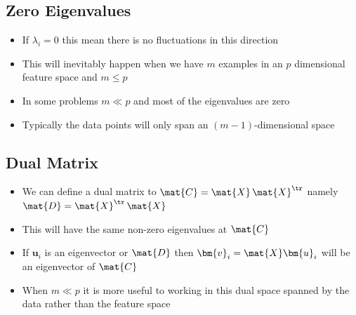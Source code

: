 
\begin{slide}
\section{Zero Eigenvalues}

\begin{PauseHighLight}
  \begin{itemize}
  \item If $\lambda_i=0$ this mean there is no fluctuations in this
    direction\pause
  \item This will inevitably happen when we have $m$ examples in an $p$
    dimensional feature space and $m\leq p$\pause
  \item In some problems $m\ll p$ and most of the eigenvalues are
    zero\pause
  \item Typically the data points will only span an $(m-1)$-dimensional
    space\pause
  \end{itemize}
\end{PauseHighLight}

\end{slide}


\begin{slide}
\section{Dual Matrix}

\begin{PauseHighLight}
  \begin{itemize}
  \item We can define a dual matrix to $\mat{C} = \mat{X}\,\mat{X}^\tr$
    namely $\mat{D} = \mat{X}^\tr\,\mat{X}$\pause
  \item This will have the same non-zero eigenvalues at $\mat{C}$\pause
  \item If $\bm{u}_i$ is an eigenvector or $\mat{D}$ then $\bm{v}_i = \mat{X}
    \bm{u}_i$ will be an eigenvector of $\mat{C}$\pause
  \item When $m\ll p$ it is more useful to working in this dual
    space spanned by the data rather than the feature space\pause
  \end{itemize}
\end{PauseHighLight}

\end{slide}


